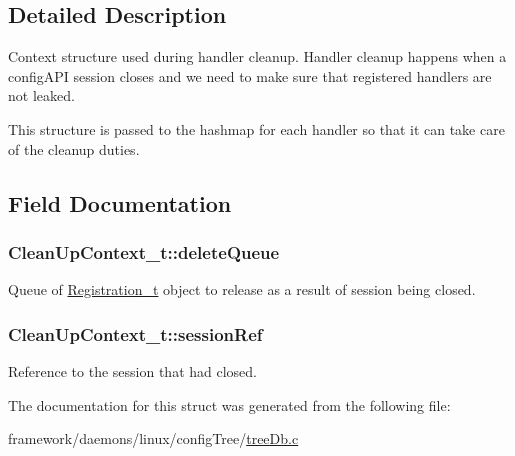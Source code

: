 \subsection{Detailed Description}
Context structure used during handler cleanup. Handler cleanup happens when a config\+A\+PI session closes and we need to make sure that registered handlers are not leaked.

This structure is passed to the hashmap for each handler so that it can take care of the cleanup duties. 

\subsection{Field Documentation}
\subsubsection[{\texorpdfstring{delete\+Queue}{deleteQueue}}]{ Clean\+Up\+Context\+\_\+t\+::delete\+Queue}\hypertarget{struct_clean_up_context__t_a9ab1d3978df13ae34fc268b5cefb4fdd}{}\label{struct_clean_up_context__t_a9ab1d3978df13ae34fc268b5cefb4fdd}
Queue of \hyperlink{struct_registration__t}{Registration\+\_\+t} object to release as a result of session being closed. 
\subsubsection[{\texorpdfstring{session\+Ref}{sessionRef}}]{ Clean\+Up\+Context\+\_\+t\+::session\+Ref}\hypertarget{struct_clean_up_context__t_a68aabd50871165a106b66c4fd2862a22}{}\label{struct_clean_up_context__t_a68aabd50871165a106b66c4fd2862a22}


Reference to the session that had closed. 



The documentation for this struct was generated from the following file\+:\begin{DoxyCompactItemize}
\item 
framework/daemons/linux/config\+Tree/\hyperlink{tree_db_8c}{tree\+Db.\+c}\end{DoxyCompactItemize}
